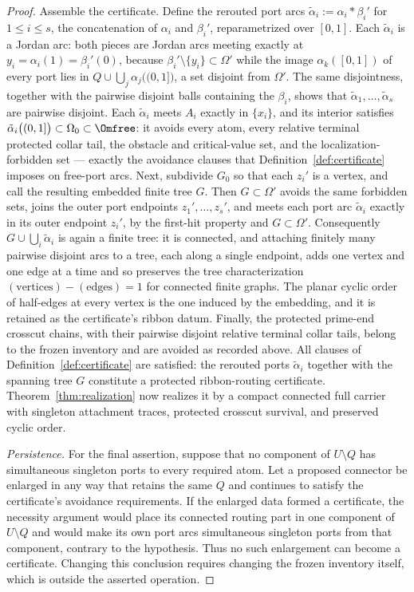 \begin{proof}
Assemble the certificate. Define the rerouted port arcs
$\tilde\alpha_i:=\alpha_i*\beta_i'$ for $1\le i\le s$, the concatenation of $\alpha_i$
and $\beta_i'$, reparametrized over $[0,1]$. Each $\tilde\alpha_i$ is a Jordan arc: both
pieces are Jordan arcs meeting exactly at $y_i=\alpha_i(1)=\beta_i'(0)$, because
$\beta_i'\setminus\{y_i\}\subset\Omega'$ while the image
$\alpha_k([0,1])$ of every port lies in
$Q\cup\bigcup_j\alpha_j\bigl((0,1]\bigr)$, a set disjoint from $\Omega'$. The same
disjointness, together with the pairwise disjoint balls containing the $\beta_i$, shows
that $\tilde\alpha_1,\dots,\tilde\alpha_s$ are pairwise disjoint. Each $\tilde\alpha_i$
meets $A_i$ exactly in $\{x_i\}$, and its interior satisfies
$\tilde\alpha_i\bigl((0,1]\bigr)\subset\Omega_0\subset\Omfree$: it avoids every atom,
every relative terminal protected collar tail, the obstacle and critical-value set, and the
localization-forbidden set --- exactly the avoidance clauses that
Definition~\ref{def:certificate} imposes on free-port arcs. Next, subdivide $G_0$ so
that each $z_i'$ is a vertex, and call the resulting embedded finite tree $G$. Then
$G\subset\Omega'$ avoids the same forbidden sets, joins the outer port endpoints
$z_1',\dots,z_s'$, and meets each port arc $\tilde\alpha_i$ exactly in its outer
endpoint $z_i'$, by the first-hit property and $G\subset\Omega'$. Consequently
$G\cup\bigcup_i\tilde\alpha_i$ is again a finite tree: it is connected, and attaching
finitely many pairwise disjoint arcs to a tree, each along a single endpoint, adds one
vertex and one edge at a time and so preserves the tree characterization
$(\text{vertices})-(\text{edges})=1$ for connected finite graphs. The planar cyclic
order of half-edges at every vertex is the one induced by the embedding, and it is
retained as the certificate's ribbon datum. Finally, the protected prime-end crosscut
chains, with their pairwise disjoint relative terminal collar tails, belong to the frozen
inventory and are avoided as recorded above. All clauses of
Definition~\ref{def:certificate} are satisfied: the rerouted ports $\tilde\alpha_i$
together with the spanning tree $G$ constitute a protected ribbon-routing certificate.
Theorem~\ref{thm:realization} now realizes it by a compact connected full carrier with
singleton attachment traces, protected crosscut survival, and preserved cyclic order.

\emph{Persistence.}
For the final assertion, suppose that no component of $U\setminus Q$ has
simultaneous singleton ports to every required atom.  Let a proposed
connector be enlarged in any way that retains the same $Q$ and continues
to satisfy the certificate's avoidance requirements.  If the enlarged
data formed a certificate, the necessity argument would place its connected
routing part in one component of $U\setminus Q$ and would make its own port
arcs simultaneous singleton ports from that component, contrary to the
hypothesis.  Thus no such enlargement can become a certificate.  Changing
this conclusion requires changing the frozen inventory itself, which is
outside the asserted operation.
\end{proof}

